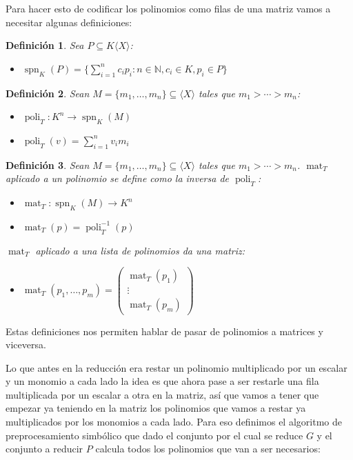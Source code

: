 \documentclass{report}
\theoremstyle{customstyle}
\newtheorem{definition}{Definición}[chapter]
\theoremstyle{factstyle}
\DeclareMathOperator{\spn}{spn} %
\DeclareMathOperator{\mat}{mat}
\DeclareMathOperator{\poli}{poli}
\begin{document}
Para hacer esto de codificar los polinomios como filas de una matriz vamos a necesitar algunas definiciones:

\begin{definition}
Sea $P ⊆ K⟨X⟩$:

\begin{itemize}
  \item $\spn_K(P) = \{∑_{i = 1}^n c_i p_i : n ∈ ℕ, c_i ∈ K, p_i ∈ P\}$
\end{itemize}

\end{definition}

\begin{definition}
Sean $M = \{m_1, …, m_n\} ⊆ ⟨X⟩$ tales que $m_1 > ⋯ > m_n$:

\begin{itemize}
  \item $\poli_T : K^n → \spn_K(M)$
  \item $\poli_T(v) = ∑_{i = 1}^n v_i m_i$
\end{itemize}

\end{definition}

\begin{definition}
Sean $M = \{m_1, …, m_n\} ⊆ ⟨X⟩$ tales que $m_1 > ⋯ > m_n$. $\mat_T$ aplicado a un polinomio se define como la inversa de $\poli_T$:

\begin{itemize}
  \item $\mat_T : \spn_K(M) → K^n$
  \item $\mat_T(p) = \poli_T^{-1}(p)$
\end{itemize}

$\mat_T$ aplicado a una lista de polinomios da una matriz:

\begin{itemize}
  \item $\mat_T(p_1, …, p_m) = \begin{pmatrix} \mat_T(p_1) \\ ⋮ \\ \mat_T(p_m) \end{pmatrix}$
\end{itemize}

\end{definition}

Estas definiciones nos permiten hablar de pasar de polinomios a matrices y viceversa.

Lo que antes en la reducción era restar un polinomio multiplicado por un escalar y un monomio a cada lado la idea es que ahora pase a ser restarle una fila multiplicada por un escalar a otra en la matriz, así que vamos a tener que empezar ya teniendo en la matriz los polinomios que vamos a restar ya multiplicados por los monomios a cada lado. Para eso definimos el algoritmo de preprocesamiento simbólico que dado el conjunto por el cual se reduce $G$ y el conjunto a reducir $P$ calcula todos los polinomios que van a ser necesarios:
\end{document}
